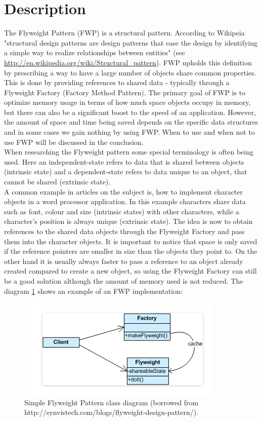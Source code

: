 \section{Description}
The Flyweight Pattern (FWP) is a structural pattern. According to Wikipeia "structural design patterns are design patterns that ease the design by identifying a simple way to realize relationships between entities" (see \url{http://en.wikipedia.org/wiki/Structural_pattern}). FWP upholds this definition by prescribing a way to have a large number of objects share common properties. This is done by providing references to shared data - typically through a Flyweight Factory (Factory Method Pattern). The primary goal of FWP is to optimize memory usage in terms of how much space objects occupy in memory, but there can also be a significant boost to the speed of an application. However, the amount of space and time being saved depends on the specific data structures and in some cases we gain nothing by using FWP. When to use and when not to use FWP will be discussed in the conclusion.\\

When researching the Flyweight pattern some special terminology is often being used. Here an independent-state refers to data that is shared between objects (intrinsic state) and a dependent-state refers to data unique to an object, that cannot be shared (extrinsic state).\\

A common example in articles on the subject is, how to implement character objects in a word processor application. In this example characters share data such as font, colour and size (intrinsic states) with other characters, while a character's position is always unique (extrinsic state). The idea is now to obtain references to the shared data objects through the Flyweight Factory and pass them into the character objects. It is important to notice that space is only saved if the reference pointers are smaller in size than the objects they point to. On the other hand it is usually always faster to pass a reference to an object already created compared to create a new object, so using the Flyweight Factory can still be a good solution although the amount of memory used is not reduced. The diagram \ref{fig:FlyweightPattern} shows an example of an FWP implementation:

\begin{figure}[h]
	\centering
	\includegraphics[width=0.7\linewidth]{Content/Pattern_example.png}
	\caption{Simple Flyweight Pattern class diagram (borrowed from http://synvistech.com/blogs/flyweight-design-pattern/).}

	\label{fig:FlyweightPattern}
\end{figure}

 